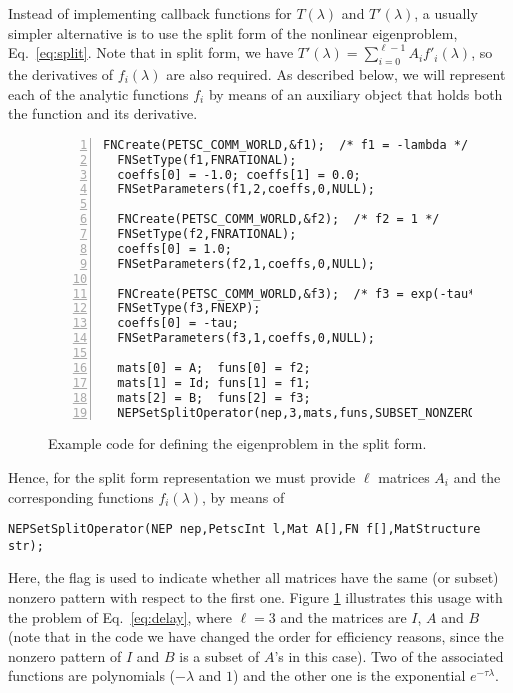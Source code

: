 Instead of implementing callback functions for $T(\lambda)$ and $T'(\lambda)$, a usually simpler alternative is to use the split form of the nonlinear eigenproblem, Eq.\ \ref{eq:split}. Note that in split form, we have $T'(\lambda)=\sum_{i=0}^{\ell-1}A_if'_i(\lambda)$, so the derivatives of $f_i(\lambda)$ are also required. As described below, we will represent each of the analytic functions $f_i$ by means of an auxiliary object  that holds both the function and its derivative.

\begin{figure}
\begin{Verbatim}[fontsize=\small,numbers=left,numbersep=6pt,xleftmargin=15mm]
  FNCreate(PETSC_COMM_WORLD,&f1);  /* f1 = -lambda */
  FNSetType(f1,FNRATIONAL);
  coeffs[0] = -1.0; coeffs[1] = 0.0;
  FNSetParameters(f1,2,coeffs,0,NULL);

  FNCreate(PETSC_COMM_WORLD,&f2);  /* f2 = 1 */
  FNSetType(f2,FNRATIONAL);
  coeffs[0] = 1.0;
  FNSetParameters(f2,1,coeffs,0,NULL);

  FNCreate(PETSC_COMM_WORLD,&f3);  /* f3 = exp(-tau*lambda) */
  FNSetType(f3,FNEXP);
  coeffs[0] = -tau;
  FNSetParameters(f3,1,coeffs,0,NULL);

  mats[0] = A;  funs[0] = f2;
  mats[1] = Id; funs[1] = f1;
  mats[2] = B;  funs[2] = f3;
  NEPSetSplitOperator(nep,3,mats,funs,SUBSET_NONZERO_PATTERN);
\end{Verbatim}
\caption{\label{fig:ex-split}Example code for defining the  eigenproblem in the split form.}
\end{figure}

Hence, for the split form representation we must provide $\ell$ matrices $A_i$ and the corresponding functions $f_i(\lambda)$, by means of%
	\begin{Verbatim}[fontsize=\small]
	NEPSetSplitOperator(NEP nep,PetscInt l,Mat A[],FN f[],MatStructure str);
	\end{Verbatim}
Here, the  flag is used to indicate whether all matrices have the same (or subset) nonzero pattern with respect to the first one.
Figure \ref{fig:ex-split} illustrates this usage with the problem of Eq.\ \ref{eq:delay}, where $\ell=3$ and the matrices are $I$, $A$ and $B$ (note that in the code we have changed the order for efficiency reasons, since the nonzero pattern of $I$ and $B$ is a subset of $A$'s in this case). Two of the associated functions are polynomials ($-\lambda$ and $1$) and the other one is the exponential $e^{-\tau\lambda}$.

